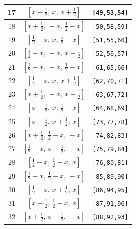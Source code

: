 \documentclass[fleqn,8pt]{jsarticle}
\begin{document}
\begin{longtable}{ccc}
17 & $\left[ x + \frac{1}{2},\, x,\, x + \frac{1}{2} \right]$ & {\tt [49,53,54]} \\ \hline
18 & $\left[ x + \frac{1}{2},\, - x,\, \frac{1}{2} - x \right]$ & {\tt [50,58,59]} \\ \hline
19 & $\left[ \frac{1}{2} - x,\, x,\, \frac{1}{2} - x \right]$ & {\tt [51,55,60]} \\ \hline
20 & $\left[ \frac{1}{2} - x,\, - x,\, x + \frac{1}{2} \right]$ & {\tt [52,56,57]} \\ \hline
21 & $\left[ \frac{1}{2} - x,\, - x,\, \frac{1}{2} - x \right]$ & {\tt [61,65,66]} \\ \hline
22 & $\left[ \frac{1}{2} - x,\, x,\, x + \frac{1}{2} \right]$ & {\tt [62,70,71]} \\ \hline
23 & $\left[ x + \frac{1}{2},\, - x,\, x + \frac{1}{2} \right]$ & {\tt [63,67,72]} \\ \hline
24 & $\left[ x + \frac{1}{2},\, x,\, \frac{1}{2} - x \right]$ & {\tt [64,68,69]} \\ \hline
25 & $\left[ x + \frac{1}{2},\, x + \frac{1}{2},\, x \right]$ & {\tt [73,77,78]} \\ \hline
26 & $\left[ x + \frac{1}{2},\, \frac{1}{2} - x,\, - x \right]$ & {\tt [74,82,83]} \\ \hline
27 & $\left[ \frac{1}{2} - x,\, x + \frac{1}{2},\, - x \right]$ & {\tt [75,79,84]} \\ \hline
28 & $\left[ \frac{1}{2} - x,\, \frac{1}{2} - x,\, x \right]$ & {\tt [76,80,81]} \\ \hline
29 & $\left[ \frac{1}{2} - x,\, \frac{1}{2} - x,\, - x \right]$ & {\tt [85,89,90]} \\ \hline
30 & $\left[ \frac{1}{2} - x,\, x + \frac{1}{2},\, x \right]$ & {\tt [86,94,95]} \\ \hline
31 & $\left[ x + \frac{1}{2},\, \frac{1}{2} - x,\, x \right]$ & {\tt [87,91,96]} \\ \hline
32 & $\left[ x + \frac{1}{2},\, x + \frac{1}{2},\, - x \right]$ & {\tt [88,92,93]} \\
\end{longtable}
\renewcommand{\arraystretch}{1.2}
\end{document}
